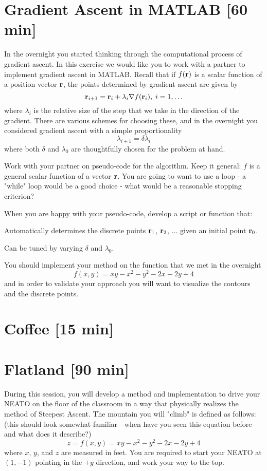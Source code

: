 \documentclass{tufte-handout}
\begin{document}
\section{Gradient Ascent in MATLAB [60 min]}

In the overnight you started thinking through the computational process of gradient ascent. In this exercise we would like you to work with a partner to implement gradient ascent in MATLAB. Recall that if $f(\mathbf{r})$ is a scalar function of a position vector $\mathbf{r}$, the points determined by gradient ascent are given by
\[\mathbf{r}_{i+1} = \mathbf{r}_{i} + \lambda_{i} \nabla f(\mathbf{r}_i), \; i = 1, \ldots \]
where $\lambda_{i}$ is the relative size of the step that we take in the direction of the gradient. There are various schemes for choosing these, and in the overnight you considered gradient ascent with a simple proportionality
\[\lambda_{i+1} = \delta \lambda_{i} \]
where both $\delta$ and $\lambda_0$ are thoughtfully chosen for the problem at hand.

\be
\item Work with your partner on pseudo-code for the algorithm. Keep it general: $f$ is a general scalar function of a vector $\mathbf{r}$. You are going to want to use a loop - a "while" loop would be a good choice - what would be a reasonable stopping criterion?
\item When you are happy with your pseudo-code, develop a script or function that: 
\be
\item Automatically determines the discrete points $\mathbf{r}_1$, $\mathbf{r}_2$, $\ldots$ given an initial point $\mathbf{r}_0$.
\item Can be tuned by varying $\delta$ and $\lambda_0$.
\ee
\ee

You should implement your method on the function that we met in the overnight
\[ f(x,y) = xy - x^2 - y^2 -2x -2y + 4 \]
and in order to validate your approach you will want to visualize the contours and the discrete points.

\section{Coffee [15 min]}

\section{Flatland [90 min]}

During this session, you will develop a method and implementation to drive your NEATO on the floor of the classroom in a way that physically realizes the method of Steepest Ascent. The mountain you will "climb" is defined as follows: (this should look somewhat familiar---when have you seen this equation before and what does it describe?)
\[z = f(x,y) = xy - x^2 - y^2 -2x -2y + 4\]
where $x$, $y$, and $z$ are measured in feet. You are required to start your NEATO at $(1,-1)$ pointing in the $+y$ direction, and work your way to the top. 
\end{document}
